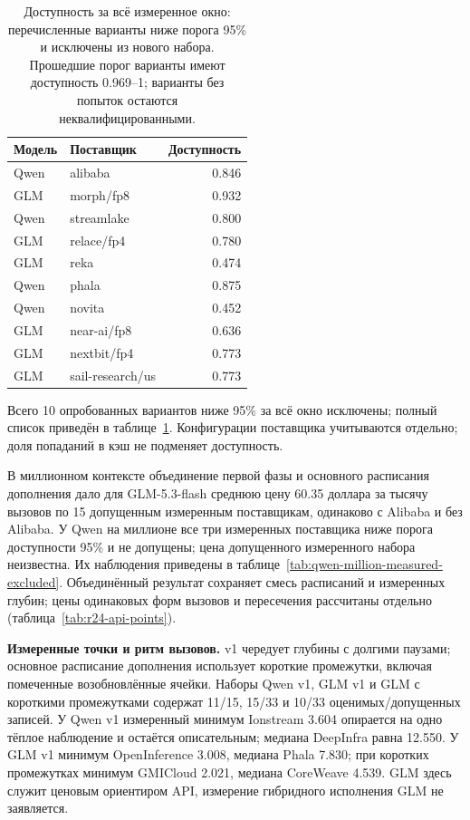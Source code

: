 \begin{table}[t]
\centering
\caption{Доступность за всё измеренное окно: перечисленные варианты ниже порога 95\% и исключены из нового набора.
Прошедшие порог варианты имеют доступность 0.969--1; варианты без попыток остаются неквалифицированными.}
\label{tab:api-availability-final}
\footnotesize
\begin{tabular}{llr}
\toprule
Модель & Поставщик & Доступность \\
\midrule
Qwen & alibaba & 0.846 \\
GLM & morph/fp8 & 0.932 \\
Qwen & streamlake & 0.800 \\
GLM & relace/fp4 & 0.780 \\
GLM & reka & 0.474 \\
Qwen & phala & 0.875 \\
Qwen & novita & 0.452 \\
GLM & near-ai/fp8 & 0.636 \\
GLM & nextbit/fp4 & 0.773 \\
GLM & sail-research/us & 0.773 \\
\bottomrule
\end{tabular}
\end{table}

Всего 10 опробованных вариантов ниже 95\% за всё окно исключены; полный список приведён в таблице~\ref{tab:api-availability-final}.
Конфигурации поставщика учитываются отдельно; доля попаданий в кэш не подменяет доступность.

В миллионном контексте объединение первой фазы и основного расписания дополнения дало
для GLM-5.3-flash среднюю цену 60.35 доллара за тысячу вызовов по 15 допущенным измеренным поставщикам,
одинаково с Alibaba и без Alibaba. У Qwen на миллионе все три измеренных поставщика ниже порога доступности 95\% и не допущены;
цена допущенного измеренного набора неизвестна. Их наблюдения приведены в таблице~\ref{tab:qwen-million-measured-excluded}. Объединённый результат сохраняет смесь расписаний и измеренных глубин;
цены одинаковых форм вызовов и пересечения рассчитаны отдельно (таблица~\ref{tab:r24-api-points}).

\textbf{Измеренные точки и ритм вызовов.} v1 чередует глубины с долгими паузами;
основное расписание дополнения использует короткие промежутки, включая помеченные возобновлённые ячейки.
Наборы Qwen v1, GLM v1 и GLM с короткими промежутками содержат 11/15, 15/33 и 10/33 оценимых/допущенных записей.
У Qwen v1 измеренный минимум Ionstream 3.604 опирается на одно тёплое наблюдение и остаётся описательным;
медиана DeepInfra равна 12.550. У GLM v1 минимум OpenInference 3.008, медиана Phala 7.830;
при коротких промежутках минимум GMICloud 2.021, медиана CoreWeave 4.539.
GLM здесь служит ценовым ориентиром API, измерение гибридного исполнения GLM не заявляется.

